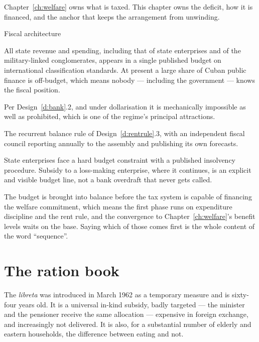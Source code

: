 Chapter~\ref{ch:welfare} owns what is taxed. This chapter owns the deficit, how
it is financed, and the anchor that keeps the arrangement from unwinding.

\begin{design}{Fiscal architecture}
\label{d:fiscal}
\begin{rules}
 All state revenue and spending, including that of state
enterprises and of the military-linked conglomerates, appears in a single
published budget on international classification standards. At present a large
share of Cuban public finance is off-budget, which means nobody --- including
the government --- knows the fiscal position.

 Per Design~\ref{d:bank}.2, and under dollarisation
it is mechanically impossible as well as prohibited, which is one of the
regime's principal attractions.

 The recurrent balance rule of Design~\ref{d:rentrule}.3, with an
independent fiscal council reporting annually to the assembly and publishing its
own forecasts.

 State enterprises face a hard budget constraint
with a published insolvency procedure. Subsidy to a loss-making enterprise, where
it continues, is an explicit and visible budget line, not a bank overdraft that
never gets called.

 The budget is brought into balance before the tax system is
capable of financing the welfare commitment, which means the first phase runs on
expenditure discipline and the rent rule, and the convergence to
Chapter~\ref{ch:welfare}'s benefit levels waits on the base. Saying which of
those comes first is the whole content of the word ``sequence''.
\end{rules}
\end{design}

\section{The ration book}

The \emph{libreta} was introduced in March 1962 as a temporary measure and is
sixty-four years old. It is a universal in-kind subsidy, badly targeted --- the
minister and the pensioner receive the same allocation --- expensive in foreign
exchange, and increasingly not delivered. It is also, for a substantial number of
elderly and eastern households, the difference between eating and not.

